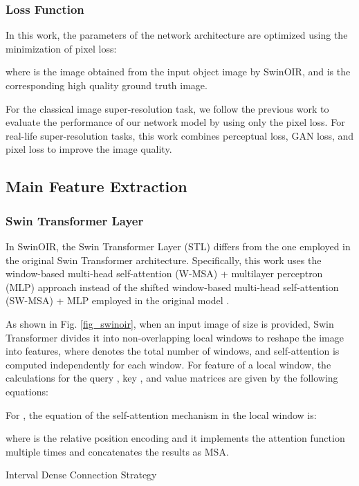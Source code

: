 \documentclass[default,iicol]{sn-jnl}
\theoremstyle{thmstyleone}\newtheorem{theorem}{Theorem}\newtheorem{proposition}[theorem]{Proposition}
\theoremstyle{thmstyletwo}\newtheorem{example}{Example}\newtheorem{remark}{Remark}\theoremstyle{thmstylethree}\newtheorem{definition}{Definition}
\begin{document}
\subsubsection{Loss Function}
In this work, the parameters of the network architecture are optimized using the minimization of  pixel loss:


where  is the image obtained from the input object image by SwinOIR, and  is the corresponding high quality ground truth image.

For the classical image super-resolution task, we follow the previous work to evaluate the performance of our network model by using only the  pixel loss. For real-life super-resolution tasks, this work combines perceptual loss, GAN loss, and pixel loss \cite{goodfellow2020generative}\cite{johnson2016perceptual}\cite{wang2021real}\cite{wang2018esrgan}\cite{zhang2021designing} to improve the image quality.

\subsection{Main Feature Extraction}
\label{MFE}
\subsubsection{Swin Transformer Layer}
In SwinOIR, the Swin Transformer Layer (STL) differs from the one employed in the original Swin Transformer \cite{liu2021swin} architecture. Specifically, this work uses the window-based multi-head self-attention (W-MSA) + multilayer perceptron (MLP) approach instead of the shifted window-based multi-head self-attention (SW-MSA) + MLP employed in the original model \cite{liang2021swinir}.

As shown in Fig. \ref{fig_swinoir}, when an input image of size  is provided, Swin Transformer divides it into  non-overlapping local windows to reshape the image into  features, where  denotes the total number of windows, and self-attention is computed independently for each window. For feature  of a local window, the calculations for the query , key , and value matrices  are given by the following equations:


For , the equation of the self-attention  mechanism in the local window is:


where  is the relative position encoding and it implements the attention function multiple times and concatenates the results as MSA.

\begin{algorithm}
\caption{Interval Dense Connection Strategy}
\label{alg}
\begin{algorithmic}
\EndIf
\EndIf
{}
\EndIf
\EndIf
\EndFor
\State{}
\EndFor
\end{algorithmic}
\end{algorithm}
\end{document}
